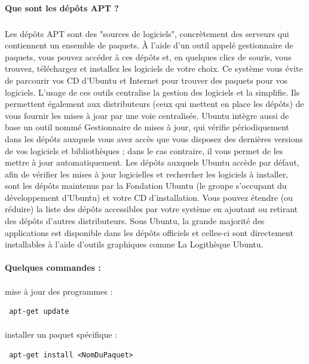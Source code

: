 \documentclass[a4paper,12pt]{article}
\begin{document}
\paragraph{Que sont les dépôts APT ?}
\subparagraph{}
Les dépôts APT sont des "sources de logiciels", concrètement des serveurs qui contiennent un ensemble de paquets. À l'aide d'un outil appelé gestionnaire de paquets, vous pouvez accéder à ces dépôts et, 
en quelques clics de souris, vous trouvez, téléchargez et installez les logiciels de votre choix.
Ce système vous évite de parcourir vos CD d'Ubuntu et Internet pour trouver des paquets pour vos logiciels.
L'usage de ces outils centralise la gestion des logiciels et la simplifie. Ils permettent également aux distributeurs (ceux qui mettent en place les dépôts) de vous fournir les mises à jour par une voie centralisée.
Ubuntu intègre aussi de base un outil nommé Gestionnaire de mises à jour, qui vérifie périodiquement dans les dépôts auxquels vous avez accès que vous disposez des dernières versions de vos logiciels et bibliothèques ;
dans le cas contraire, il vous permet de les mettre à jour automatiquement.
Les dépôts auxquels Ubuntu accède par défaut, afin de vérifier les mises à jour logicielles et rechercher les logiciels à installer, sont les dépôts maintenus par la Fondation Ubuntu 
(le groupe s'occupant du développement d'Ubuntu) et votre CD d'installation. Vous pouvez étendre (ou réduire) la liste des dépôts accessibles par votre système en ajoutant ou retirant des dépôts d'autres distributeurs. 
Sous Ubuntu, la grande majorité des applications est disponible dans les dépôts officiels et celles-ci sont directement installables à l'aide d'outils graphiques comme La Logithèque Ubuntu.

\paragraph{Quelques commandes : }
\paragraph{}
mise à jour des programmes :
\begin{verbatim}
 apt-get update
\end{verbatim}
\paragraph{}
installer un  paquet spécifique :
\begin{verbatim}
 apt-get install <NomDuPaquet>
\end{verbatim}
\end{document}
